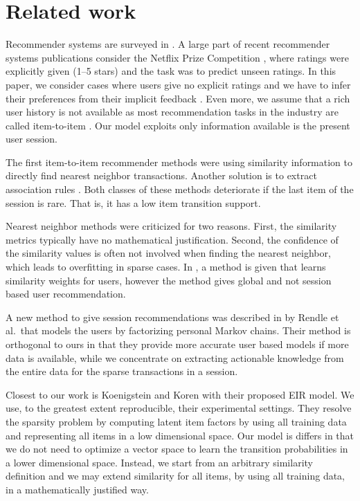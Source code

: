 \section{Related work}

Recommender systems are surveyed in \cite{ricci2011introduction}.
A large part of recent recommender systems publications consider the Netflix Prize Competition  \cite{bennett2007netflix}, where ratings were explicitly given (1--5 stars) and the task was to predict unseen ratings.
In this paper, we consider cases where users give no explicit ratings and we have to infer their preferences from their implicit feedback \cite{koenigstein2013towards}.
Even more, we assume that a rich user history is not available as most recommendation tasks in the industry are called item-to-item \cite{pilaszy2015neighbor}. Our model exploits only information available is the present user session.

The first item-to-item recommender methods \cite{sarwar01item,amazon-recommender} were using similarity information to directly find nearest neighbor \cite{desrosiers2011comprehensive} transactions. 
Another solution is to extract association rules \cite{davidson2010youtube}.
Both classes of these methods deteriorate if the last item of the session is rare. That is, it has a low item transition support.

Nearest neighbor methods were criticized for two reasons.  First, the similarity metrics typically have no mathematical justification. Second, the confidence of the similarity values is often not involved when finding the nearest neighbor, which leads to overfitting in sparse cases. 
In \cite{koren2010factor}, a method is given that learns similarity weights for users, however the method gives global and not session based user recommendation.

A new method to give session recommendations was described in \cite{rendle2010factorizing} by Rendle et al.\ that models the users by factorizing personal Markov chains.
Their method is orthogonal to ours in that they provide more accurate user based models if more data is available, while we concentrate on extracting actionable knowledge from the entire data for the sparse transactions in a session.

Closest to our work is Koenigstein and Koren \cite{koenigstein2013towards} with their proposed EIR model.
We use, to the greatest extent reproducible, their experimental settings.
They resolve the sparsity problem by computing latent item factors by using all training data and representing all items in a low dimensional space. Our model is differs in that we do not need to optimize a vector space to learn the transition probabilities in a lower dimensional space. Instead, we start from an arbitrary similarity definition and we may extend similarity for all items, by using all training data, in a mathematically justified way.

